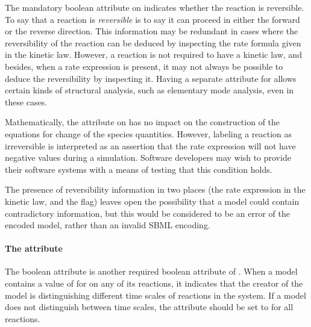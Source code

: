 The mandatory boolean attribute  on \Reaction
indicates whether the reaction is reversible.  To say that a
reaction is \emph{reversible} is to say it can proceed in either
the forward or the reverse direction.  This information may be
redundant in cases where the reversibility of the reaction can be
deduced by inspecting the rate formula given in the kinetic law.
However, a reaction is not required to have a kinetic law, and
besides, when a rate expression is present, it may not always be
possible to deduce the reversibility by inspecting it.  Having a
separate attribute for  allows certain kinds of
structural analysis, such as elementary mode analysis, even in
these cases.

Mathematically, the  attribute on \Reaction has
no impact on the construction of the equations for change of the
species quantities.  However, labeling a reaction as irreversible
is interpreted as an assertion that the rate expression will not
have negative values during a simulation.  Software developers may
wish to provide their software systems with a means of testing
that this condition holds.

The presence of reversibility information in two places (\ie the
rate expression in the kinetic law, and the 
flag) leaves open the possibility that a model could contain
contradictory information, but this would be considered to be an
error of the encoded model, rather than an invalid SBML encoding.


\paragraph{The  attribute}
\label{sec:fast}

The boolean attribute  is another required boolean
attribute of \Reaction.  When a model contains a value of
 for  on any of its reactions, it indicates
that the creator of the model is distinguishing different time
scales of reactions in the system.  If a model does not
distinguish between time scales, the  attribute should
be set to  for all reactions.

